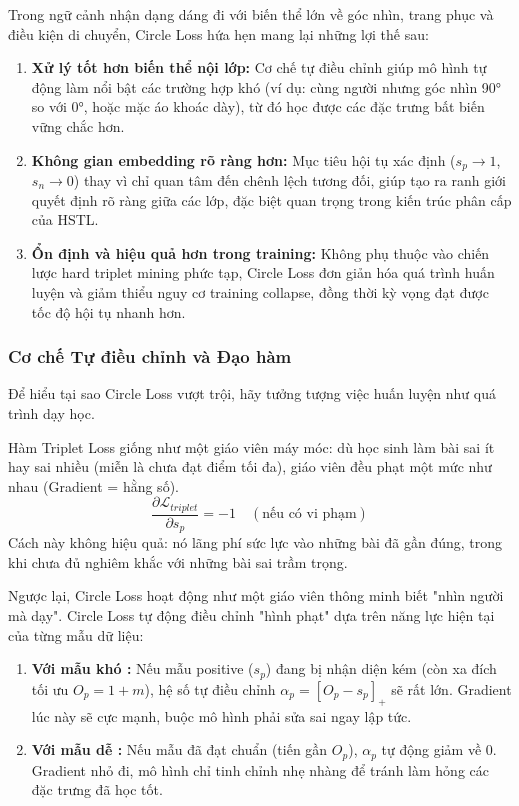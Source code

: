 Trong ngữ cảnh nhận dạng dáng đi với biến thể lớn về góc nhìn, trang phục và điều kiện di chuyển, Circle Loss hứa hẹn mang lại những lợi thế sau:
\begin{enumerate}
  \item \textbf{Xử lý tốt hơn biến thể nội lớp:} Cơ chế tự điều chỉnh giúp mô hình tự động làm nổi bật các trường hợp khó (ví dụ: cùng người nhưng góc nhìn 90° so với 0°, hoặc mặc áo khoác dày), từ đó học được các đặc trưng bất biến vững chắc hơn.
  \item \textbf{Không gian embedding rõ ràng hơn:} Mục tiêu hội tụ xác định ($s_p \rightarrow 1$, $s_n \rightarrow 0$) thay vì chỉ quan tâm đến chênh lệch tương đối, giúp tạo ra ranh giới quyết định rõ ràng giữa các lớp, đặc biệt quan trọng trong kiến trúc phân cấp của HSTL.
  \item \textbf{Ổn định và hiệu quả hơn trong training:} Không phụ thuộc vào chiến lược hard triplet mining phức tạp, Circle Loss đơn giản hóa quá trình huấn luyện và giảm thiểu nguy cơ training collapse, đồng thời kỳ vọng đạt được tốc độ hội tụ nhanh hơn.
\end{enumerate}

\subsubsection{Cơ chế Tự điều chỉnh và Đạo hàm}

Để hiểu tại sao Circle Loss vượt trội, hãy tưởng tượng việc huấn luyện như quá trình dạy học.

Hàm Triplet Loss giống như một giáo viên máy móc: dù học sinh làm bài sai ít hay sai nhiều (miễn là chưa đạt điểm tối đa), giáo viên đều phạt một mức như nhau (Gradient = hằng số).
\begin{equation}
  \frac{\partial \mathcal{L}_{triplet}}{\partial s_p} = -1 \quad (\text{nếu có vi phạm})
\end{equation}
Cách này không hiệu quả: nó lãng phí sức lực vào những bài đã gần đúng, trong khi chưa đủ nghiêm khắc với những bài sai trầm trọng.

Ngược lại, Circle Loss hoạt động như một giáo viên thông minh biết "nhìn người mà dạy". Circle Loss tự động điều chỉnh "hình phạt" dựa trên năng lực hiện tại của từng mẫu dữ liệu:

\begin{enumerate}
  \item \textbf{Với mẫu khó :} Nếu mẫu positive ($s_p$) đang bị nhận diện kém (còn xa đích tối ưu $O_p=1+m$), hệ số tự điều chỉnh $\alpha_p = [O_p - s_p]_+$ sẽ rất lớn. Gradient lúc này sẽ cực mạnh, buộc mô hình phải sửa sai ngay lập tức.
  \item \textbf{Với mẫu dễ :} Nếu mẫu đã đạt chuẩn (tiến gần $O_p$), $\alpha_p$ tự động giảm về 0. Gradient nhỏ đi, mô hình chỉ tinh chỉnh nhẹ nhàng  để tránh làm hỏng các đặc trưng đã học tốt.
\end{enumerate}

